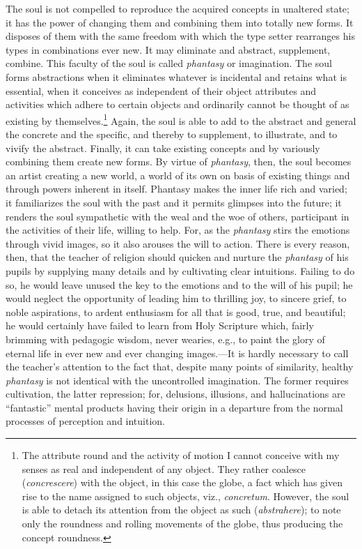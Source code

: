 The soul is not compelled to reproduce the acquired concepts in unaltered state; it has the power of changing them and combining them into totally new forms. It disposes of them with the same freedom with which the type setter rearranges his types in combinations ever new. It may eliminate and abstract, supplement, combine. This faculty of the soul is called \emph{phantasy} or imagination. The soul forms abstractions when it eliminates whatever is incidental and retains what is essential, when it conceives as independent of their object attributes and activities which adhere to certain objects and ordinarily cannot be thought of as existing by themselves.\footnote{The attribute round and the activity of motion I cannot conceive with my senses as real and independent of any object. They rather coalesce (\emph{concrescere}) with the object, in this case the globe, a fact which has given rise to the name assigned to such objects, viz., \emph{concretum}. However, the soul is able to detach its attention from the object as such (\emph{abstrahere}); to note only the roundness and rolling movements of the globe, thus producing the concept roundness.} Again, the soul is able to add to the abstract and general the concrete and the specific, and thereby to supplement, to illustrate, and to vivify the abstract. Finally, it can take existing concepts and by variously combining them create new forms. By virtue of \emph{phantasy}, then, the soul becomes an artist creating a new world, a world of its own on basis of existing things and through powers inherent
in itself. Phantasy makes the inner life rich and varied; it familiarizes the soul with the past and it permits glimpses into the future; it renders the soul sympathetic with the weal and the woe of others, participant in the activities of their life, willing to help. For, as the \emph{phantasy} stirs the emotions through vivid images, so it also arouses the will to action. There is every reason, then, that the teacher of religion should quicken and nurture the \emph{phantasy} of his pupils by supplying many details and by cultivating clear intuitions. Failing to do so, he would leave unused the key to the emotions and to the will of his pupil; he would neglect the opportunity of leading him to thrilling joy, to sincere grief, to noble aspirations, to ardent enthusiasm for all that is good, true, and beautiful; he would certainly have failed to learn from Holy Scripture which, fairly brimming with pedagogic wisdom, never wearies, e.g., to paint the glory of eternal life in ever new and ever changing images.—It is hardly necessary to call the teacher’s attention to the fact that, despite many points of similarity, healthy \emph{phantasy} is not identical with the uncontrolled imagination. The former requires cultivation, the latter repression; for, delusions, illusions, and hallucinations are “fantastic” mental products having their origin in a departure from the normal processes of perception and intuition.

